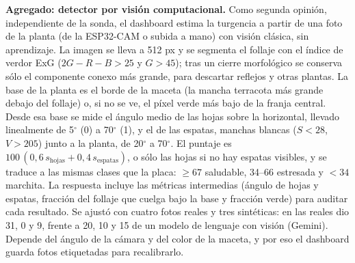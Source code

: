 \documentclass[10pt,a4paper]{article}
\begin{document}
\textbf{Agregado: detector por visión computacional.} Como segunda opinión, independiente de la sonda, el dashboard estima la turgencia a partir de una foto de la planta (de la ESP32-CAM o subida a mano) con visión clásica, sin aprendizaje. La imagen se lleva a 512 px y se segmenta el follaje con el índice de verdor ExG ($2G-R-B>25$ y $G>45$); tras un cierre morfológico se conserva sólo el componente conexo más grande, para descartar reflejos y otras plantas. La base de la planta es el borde de la maceta (la mancha terracota más grande debajo del follaje) o, si no se ve, el píxel verde más bajo de la franja central. Desde esa base se mide el ángulo medio de las hojas sobre la horizontal, llevado linealmente de 5$^\circ$ (0) a 70$^\circ$ (1), y el de las espatas, manchas blancas ($S<28$, $V>205$) junto a la planta, de 20$^\circ$ a 70$^\circ$. El puntaje es $100\,(0{,}6\,s_\mathrm{hojas}+0{,}4\,s_\mathrm{espatas})$, o sólo las hojas si no hay espatas visibles, y se traduce a las mismas clases que la placa: $\geq 67$ saludable, 34--66 estresada y $<34$ marchita. La respuesta incluye las métricas intermedias (ángulo de hojas y espatas, fracción del follaje que cuelga bajo la base y fracción verde) para auditar cada resultado. Se ajustó con cuatro fotos reales y tres sintéticas: en las reales dio 31, 0 y 9, frente a 20, 10 y 15 de un modelo de lenguaje con visión (Gemini). Depende del ángulo de la cámara y del color de la maceta, y por eso el dashboard guarda fotos etiquetadas para recalibrarlo.
\end{document}
